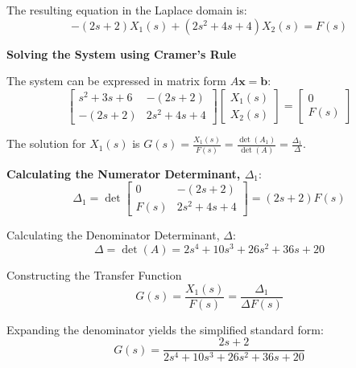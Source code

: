 \documentclass[11pt]{article}
\begin{document}
The resulting equation in the Laplace domain is:
\begin{equation}
-(2s + 2)X_1(s) + (2s^2 + 4s + 4)X_2(s) = F(s) \tag{2}
\end{equation}

\newpage
\noindent\textbf{Solving the System using Cramer's Rule}
\vspace{12pt}

The system can be expressed in matrix form $A\mathbf{x} = \mathbf{b}$:
$$
\begin{bmatrix}
s^2 + 3s + 6 & -(2s + 2) \\
-(2s + 2) & 2s^2 + 4s + 4
\end{bmatrix}
\begin{bmatrix}
X_1(s) \\
X_2(s)
\end{bmatrix}
=
\begin{bmatrix}
0 \\
F(s)
\end{bmatrix}
$$

The solution for $X_1(s)$ is $G(s) = \frac{X_1(s)}{F(s)} = \frac{\det(A_1)}{\det(A)} = \frac{\Delta_1}{\Delta}$.

\vspace{12pt}
\noindent\textbf{Calculating the Numerator Determinant, $\Delta_1$}:
$$ \Delta_1 = \det
\begin{bmatrix}
0 & -(2s + 2) \\
F(s) & 2s^2 + 4s + 4
\end{bmatrix}
= (2s + 2)F(s) $$

{Calculating the Denominator Determinant, $\Delta$}:
$$\Delta = \det(A) = 2s^4 + 10s^3 + 26s^2 + 36s + 20$$

{Constructing the Transfer Function}
$$G(s) = \frac{X_1(s)}{F(s)} = \frac{\Delta_1}{\Delta F(s)}$$

Expanding the denominator yields the simplified standard form:
\[
\boxed{
G(s) = \frac{2s + 2}{2s^4 + 10s^3 + 26s^2 + 36s + 20}
}
\]

\end{document}
